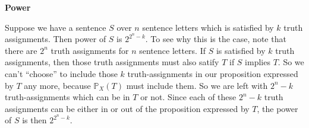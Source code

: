 \begin{mdframed}[linewidth=1]
\textbf{Power}

Suppose we have a sentence $S$ over $n$ sentence letters which is satisfied by $k$ truth assignments. Then power of $S$ is $2^{2^n - k}$. To see why this is the case, note that there are $2^n$ truth assignments for $n$ sentence letters. If $S$ is satisfied by $k$ truth assignments, then those truth assignments must also satify $T$ if $S$ implies $T$. So we can't ``choose'' to include those $k$ truth-assignments in our proposition expressed by $T$ any more, because $\mathbb{P}_X(T)$ must include them. So we are left with $2^n - k$ truth-assignments which can be in $T$ or not. Since each of these $2^n - k$ truth assignments can be either in or out of the proposition expressed by $T$, the power of $S$ is then $2^{2^n - k}$.
\end{mdframed}


